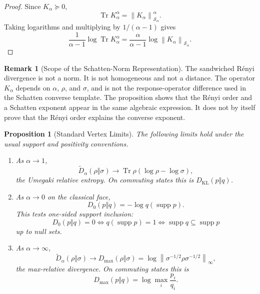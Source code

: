\documentclass[12pt]{article}
\newtheorem{proposition}[theorem]{Proposition}
\theoremstyle{definition}
\newtheorem{remark}[theorem]{Remark}
\DeclareMathOperator{\Tr}{Tr}
\DeclareMathOperator{\supp}{supp}
\newcommand{\norm}[1]{\left\lVert#1\right\rVert}
\newcommand{\Sp}[1]{\mathcal S_{#1}}
\newcommand{\Ren}[1]{D_{#1}}
\newcommand{\sRen}[1]{\widetilde D_{#1}}
\newcommand{\KL}{D_{\mathrm{KL}}}
\newcommand{\Dmax}{D_{\max}}
\begin{document}
\begin{proof}
Since $K_\alpha\succeq0$,
\[
\Tr K_\alpha^\alpha
=
\norm{K_\alpha}_{\Sp{\alpha}}^\alpha.
\]
Taking logarithms and multiplying by $1/(\alpha-1)$ gives
\[
\frac{1}{\alpha-1}\log\Tr K_\alpha^\alpha
=
\frac{\alpha}{\alpha-1}
\log
\norm{K_\alpha}_{\Sp{\alpha}}.
\]
\end{proof}

\begin{remark}[Scope of the Schatten-Norm Representation]
\label{rem:schatten-rep-scope}
The sandwiched R\'enyi divergence is not a norm.  It is not homogeneous and not
a distance.  The operator $K_\alpha$ depends on $\alpha$, $\rho$, and
$\sigma$, and is not the response-operator difference used in the Schatten
converse template.  The proposition shows that the R\'enyi order and a Schatten
exponent appear in the same algebraic expression.  It does not by itself prove
that the R\'enyi order explains the converse exponent.
\end{remark}

\begin{proposition}[Standard Vertex Limits]
\label{prop:renyi-limits}
The following limits hold under the usual support and positivity conventions.
\begin{enumerate}[label=(\roman*)]
\item As $\alpha\to1$,
\[
\sRen{\alpha}(\rho\Vert\sigma)
\to
\Tr\rho(\log\rho-\log\sigma),
\]
the Umegaki relative entropy.  On commuting states this is
$\KL(p\Vert q)$.

\item As $\alpha\to0$ on the classical face,
\[
\Ren{0}(p\Vert q)
=
-\log q(\supp p).
\]
This tests one-sided support inclusion:
\[
\Ren{0}(p\Vert q)=0
\iff
q(\supp p)=1
\iff
\supp q\subseteq\supp p
\]
up to null sets.

\item As $\alpha\to\infty$,
\[
\sRen{\alpha}(\rho\Vert\sigma)
\to
\Dmax(\rho\Vert\sigma)
=
\log
\left\|
\sigma^{-1/2}\rho\sigma^{-1/2}
\right\|_\infty,
\]
the max-relative divergence.  On commuting states this is
\[
\Dmax(p\Vert q)
=
\log\max_i\frac{p_i}{q_i}.
\]
\end{enumerate}
\end{proposition}
\end{document}
